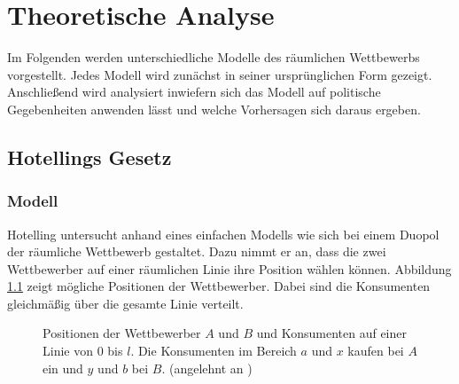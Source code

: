 \chapter{Theoretische Analyse}\label{Kap-Theorie}

\noindent
Im Folgenden werden unterschiedliche Modelle des räumlichen Wettbewerbs vorgestellt. Jedes Modell wird zunächst in seiner ursprünglichen Form gezeigt. Anschließend wird analysiert inwiefern sich das Modell auf politische Gegebenheiten anwenden lässt und welche Vorhersagen sich daraus ergeben.

\section{Hotellings Gesetz}\label{Sec-Hotelling}

\subsection{Modell}\label{Sec-Hotelling-Modell}

Hotelling \citep{hotelling1929} untersucht anhand eines einfachen Modells wie sich bei einem Duopol der räumliche Wettbewerb gestaltet. Dazu nimmt er an, dass die zwei Wettbewerber auf einer räumlichen Linie ihre Position wählen können. Abbildung \ref{Fig-Linearer-Wettbewerb} zeigt mögliche Positionen der Wettbewerber. Dabei sind die Konsumenten gleichmäßig über die gesamte Linie verteilt.

\begin{figure}[htb]
	\centering
	\caption{Positionen der Wettbewerber $A$ und $B$ und Konsumenten auf einer Linie von $0$ bis $l$. Die Konsumenten im Bereich $a$ und $x$ kaufen bei $A$ ein und $y$ und $b$ bei $B$. (angelehnt an \cite{hotelling1929})}
	\label{Fig-Linearer-Wettbewerb}
\end{figure}

